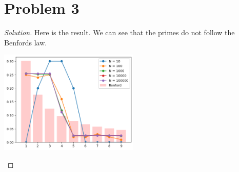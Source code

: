 \section*{Problem 3}
	\begin{proof} [Solution]
		Here is the result. We can see that the primes do not follow the Benford\textquotesingle s law.
		\begin{center}
			\includegraphics[width=0.5\textwidth]{primes.png}
		\end{center}
	\end{proof}